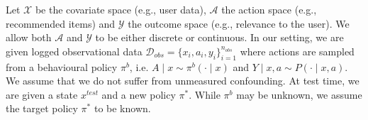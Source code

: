 Let $\mathcal{X}$ be the covariate space (e.g., user  data), $\mathcal{A}$ the action space (e.g., recommended items) and $\mathcal{Y}$ the outcome space (e.g., relevance to the user).
We allow both $\mathcal{A}$ and $\mathcal{Y}$ to be either discrete or continuous.
In our setting, we are given logged observational data $\mathcal{D}_{obs}=\{x_i, a_i, y_i \}_{i=1}^{n_{obs}}$ where actions are sampled from a behavioural policy $\pi^{b}$, i.e. $A \mid x \sim \pi^{b}(\cdot\mid x)$ and $Y \mid x,a \sim P(\cdot \mid x, a)$. We assume that we do not suffer from unmeasured confounding. At test time, we are given a state $x^{test}$ and a new policy $\pi^*$. While $\pi^{b}$ may be unknown, we assume the target policy $\pi^*$ to be known.
